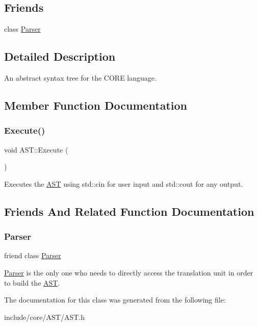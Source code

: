 \subsection*{Friends}
\begin{DoxyCompactItemize}
\item 
class \mbox{\hyperlink{class_a_s_t_ab80291af9c262f63b83fa9c16f12014d}{Parser}}
\end{DoxyCompactItemize}


\subsection{Detailed Description}
An abstract syntax tree for the C\+O\+RE language. 

\subsection{Member Function Documentation}
\mbox{\label{class_a_s_t_add81dbf0bbcd986b5fef53f641865462}} 
\subsubsection{\texorpdfstring{Execute()}{Execute()}}
{\footnotesize\ttfamily void A\+S\+T\+::\+Execute (\begin{DoxyParamCaption}{ }\end{DoxyParamCaption})}

Executes the \mbox{\hyperlink{class_a_s_t}{A\+ST}} using std\+::cin for user input and std\+::cout for any output. 

\subsection{Friends And Related Function Documentation}
\mbox{\label{class_a_s_t_ab80291af9c262f63b83fa9c16f12014d}} 
\subsubsection{\texorpdfstring{Parser}{Parser}}
{\footnotesize\ttfamily friend class \mbox{\hyperlink{class_parser}{Parser}}\hspace{0.3cm}{\ttfamily [friend]}}

\mbox{\hyperlink{class_parser}{Parser}} is the only one who needs to directly access the translation unit in order to build the \mbox{\hyperlink{class_a_s_t}{A\+ST}}. 

The documentation for this class was generated from the following file\+:\begin{DoxyCompactItemize}
\item 
include/core/\+A\+S\+T/A\+S\+T.\+h\end{DoxyCompactItemize}
